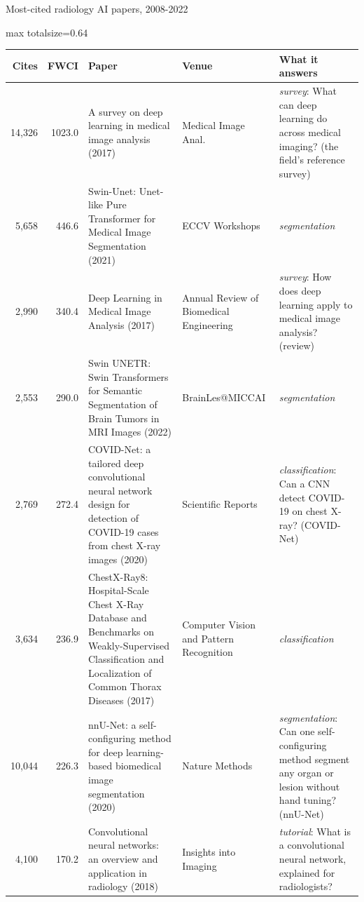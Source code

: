 \documentclass[aspectratio=169]{beamer}
\renewcommand{\arraystretch}{1.08}
\begin{document}
\begin{frame}[category=Journals/Preprints]{Most-cited radiology AI papers, 2008-2022}
\tiny
\begin{adjustbox}{max totalsize={\textwidth}{0.64\textheight}}
\renewcommand{\arraystretch}{1.2}
\begin{tabular}{|r|r|>{\raggedright\arraybackslash}p{}|>{\raggedright\arraybackslash}p{}|>{\raggedright\arraybackslash}p{}|}
\hline \textbf{Cites} & \textbf{FWCI} & \textbf{Paper} & \textbf{Venue} & \textbf{What it answers} \\ \hline
14,326 & 1023.0 & A survey on deep learning in medical image analysis (2017) & Medical Image Anal. & \textit{survey}: What can deep learning do across medical imaging? (the field's reference survey) \\ \hline
5,658 & 446.6 & Swin-Unet: Unet-like Pure Transformer for Medical Image Segmentation (2021) & ECCV Workshops & \textit{segmentation} \\ \hline
2,990 & 340.4 & Deep Learning in Medical Image Analysis (2017) & Annual Review of Biomedical Engineering & \textit{survey}: How does deep learning apply to medical image analysis? (review) \\ \hline
2,553 & 290.0 & Swin UNETR: Swin Transformers for Semantic Segmentation of Brain Tumors in MRI Images (2022) & BrainLes@MICCAI & \textit{segmentation} \\ \hline
2,769 & 272.4 & COVID-Net: a tailored deep convolutional neural network design for detection of COVID-19 cases from chest X-ray images (2020) & Scientific Reports & \textit{classification}: Can a CNN detect COVID-19 on chest X-ray? (COVID-Net) \\ \hline
3,634 & 236.9 & ChestX-Ray8: Hospital-Scale Chest X-Ray Database and Benchmarks on Weakly-Supervised Classification and Localization of Common Thorax Diseases (2017) & Computer Vision and Pattern Recognition & \textit{classification} \\ \hline
10,044 & 226.3 & nnU-Net: a self-configuring method for deep learning-based biomedical image segmentation (2020) & Nature Methods & \textit{segmentation}: Can one self-configuring method segment any organ or lesion without hand tuning? (nnU-Net) \\ \hline
4,100 & 170.2 & Convolutional neural networks: an overview and application in radiology (2018) & Insights into Imaging & \textit{tutorial}: What is a convolutional neural network, explained for radiologists? \\ \hline

\end{tabular}
\end{adjustbox}
\end{frame}
\end{document}
